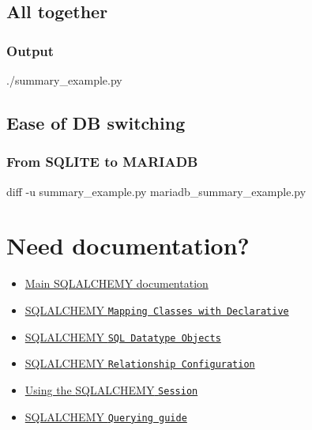 \documentclass[english]{beamer}
\newcommand{\PROGRAMDIR}{data}
\begin{document}
\subsection{All together}
\begin{frame}[containsverbatim]
    \lstset{basicstyle=\tiny\ttfamily,language=Python,numbers=left}
    \resizebox{\textwidth}{!}{%
        
    }
\end{frame}
\begin{frame}[containsverbatim]
    \frametitle{Output}
\bash[stdout,ignoreExitCode,ignoreStderr,prefix={}]
./summary_example.py
\END
\end{frame}

\subsection{Ease of DB switching}
\begin{frame}[containsverbatim]
    \frametitle{From \gls{SQLITE} to \gls{MARIADB}}
    \lstset{basicstyle=\tiny\ttfamily,language=Python,numbers=left}
    \bash[ignoreExitCode,ignoreStderr,prefix={}]
diff -u summary_example.py mariadb_summary_example.py
\END
    \lstset{basicstyle=\scriptsize\ttfamily,language=diff,numbers=none}
    \resizebox{\textwidth}{!}{%
        
    }
\end{frame}

\section{Need documentation?}
\begin{frame}
    \begin{itemize}
    \item \href{https://docs.sqlalchemy.org/}{Main \gls{SQLALCHEMY} documentation}
    \item \href{https://docs.sqlalchemy.org/en/20/orm/declarative_mapping.html}{\gls{SQLALCHEMY} \texttt{Mapping Classes with Declarative}}
    \item \href{https://docs.sqlalchemy.org/en/20/core/types.html}{\gls{SQLALCHEMY} \texttt{SQL Datatype Objects}}
    \item \href{https://docs.sqlalchemy.org/en/20/orm/relationships.html}{\gls{SQLALCHEMY} \texttt{Relationship Configuration}}
    \item \href{https://docs.sqlalchemy.org/en/20/orm/session.html}{Using the \gls{SQLALCHEMY} \texttt{Session}}
    \item \href{https://docs.sqlalchemy.org/en/20/orm/queryguide/}{\gls{SQLALCHEMY} \texttt{Querying guide}}
    \end{itemize}
\end{frame}

\clearpage
{\scriptsize\printglossary}
\end{document}
